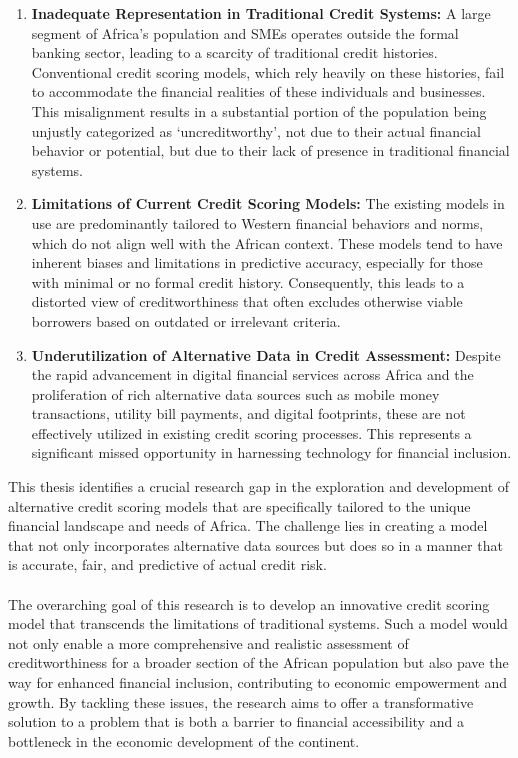 \documentclass[a4paper,11pt,fleqn]{report}
\begin{document}
\begin{enumerate}
  \item \textbf{Inadequate Representation in Traditional Credit Systems:} A large segment of Africa's population and SMEs operates outside the formal banking sector, leading to a scarcity of traditional credit histories. Conventional credit scoring models, which rely heavily on these histories, fail to accommodate the financial realities of these individuals and businesses. This misalignment results in a substantial portion of the population being unjustly categorized as ‘uncreditworthy’, not due to their actual financial behavior or potential, but due to their lack of presence in traditional financial systems.
  
  \item \textbf{Limitations of Current Credit Scoring Models:} The existing models in use are predominantly tailored to Western financial behaviors and norms, which do not align well with the African context. These models tend to have inherent biases and limitations in predictive accuracy, especially for those with minimal or no formal credit history. Consequently, this leads to a distorted view of creditworthiness that often excludes otherwise viable borrowers based on outdated or irrelevant criteria.
  
  \item \textbf{Underutilization of Alternative Data in Credit Assessment:} Despite the rapid advancement in digital financial services across Africa and the proliferation of rich alternative data sources such as mobile money transactions, utility bill payments, and digital footprints, these are not effectively utilized in existing credit scoring processes. This represents a significant missed opportunity in harnessing technology for financial inclusion.
\end{enumerate}

This thesis identifies a crucial research gap in the exploration and development of alternative credit scoring models that are specifically tailored to the unique financial landscape and needs of Africa. The challenge lies in creating a model that not only incorporates alternative data sources but does so in a manner that is accurate, fair, and predictive of actual credit risk.
\\\\
The overarching goal of this research is to develop an innovative credit scoring model that transcends the limitations of traditional systems. Such a model would not only enable a more comprehensive and realistic assessment of creditworthiness for a broader section of the African population but also pave the way for enhanced financial inclusion, contributing to economic empowerment and growth. By tackling these issues, the research aims to offer a transformative solution to a problem that is both a barrier to financial accessibility and a bottleneck in the economic development of the continent.
\end{document}

